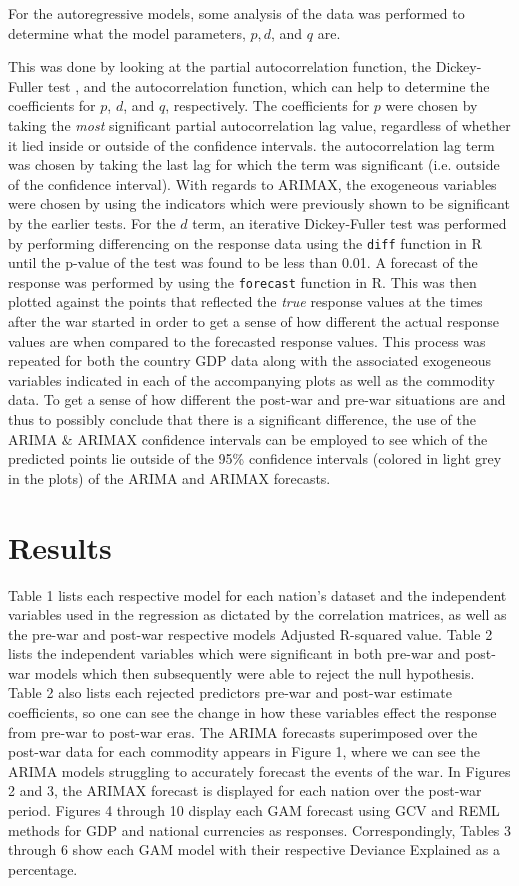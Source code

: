\documentclass[11pt,regno]{amsart}
\theoremstyle{plain}
\numberwithin{equation}{section}
\begin{document}
For the autoregressive models, some analysis of the data was performed to determine what the model parameters, $p,d$, and $q$ are. 

This was done by looking at the partial autocorrelation function, the Dickey-Fuller test \cite{Dickey-Fuller}, and the autocorrelation function, which can help to determine the coefficients for $p$, $d$, and $q$, respectively. The coefficients for $p$ were chosen by taking the \textit{most} significant partial autocorrelation lag value, regardless of whether it lied inside or outside of the confidence intervals. the autocorrelation lag term was chosen by taking the last lag for which the term was significant (i.e. outside of the confidence interval). With regards to ARIMAX, the exogeneous variables were chosen by using the indicators which were previously shown to be significant by the earlier tests.  For the $d$ term, an iterative Dickey-Fuller test was performed by performing differencing on the response data using the \texttt{diff} function in R until the p-value of the test was found to be less than 0.01. A forecast of the response was performed by using the \texttt{forecast} function in R. This was then plotted against the points that reflected the \textit{true} response values at the times after the war started in order to get a sense of how different the actual response values are when compared to the forecasted response values. This process was repeated for both the country GDP data along with the associated exogeneous variables indicated in each of the accompanying plots as well as the commodity data. To get a sense of how different the post-war and pre-war situations are and thus to possibly conclude that there is a significant difference, the use of the ARIMA $\&$ ARIMAX confidence intervals can be employed to see which of the predicted points lie outside of the 95\% confidence intervals (colored in light grey in the plots) of the ARIMA and ARIMAX forecasts. 

\section*{Results}
Table 1 lists each respective model for each nation's dataset and the independent variables used in the regression as dictated by the correlation matrices, as well as the pre-war and post-war respective models Adjusted R-squared value. Table 2 lists the independent variables which were significant in both pre-war and post-war models which then subsequently were able to reject the null hypothesis. Table 2 also lists each rejected predictors pre-war and post-war estimate coefficients, so one can see the change in how these variables effect the response from pre-war to post-war eras. The ARIMA forecasts superimposed over the post-war data for each commodity appears in Figure 1, where we can see the ARIMA models struggling to accurately forecast the events of the war. In Figures 2 and 3, the ARIMAX forecast is displayed for each nation over the post-war period. Figures 4 through 10 display each GAM forecast using GCV and REML methods for GDP and national currencies as responses. Correspondingly, Tables 3 through 6 show each GAM model with their respective Deviance Explained as a percentage.
\end{document}
